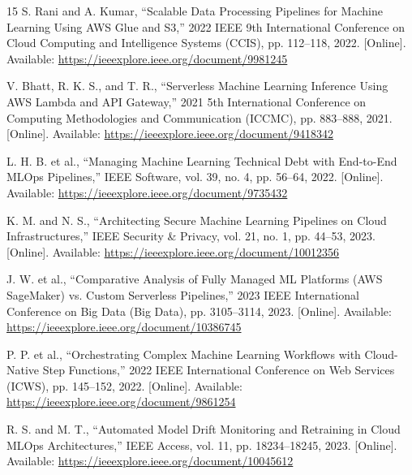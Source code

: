 \documentclass[conference]{IEEEtran}
\begin{document}
\begin{thebibliography}{15}
S. Rani and A. Kumar, ``Scalable Data Processing Pipelines for Machine Learning Using AWS Glue and S3,'' 2022 IEEE 9th International Conference on Cloud Computing and Intelligence Systems (CCIS), pp. 112--118, 2022. [Online]. Available: \url{https://ieeexplore.ieee.org/document/9981245}

V. Bhatt, R. K. S., and T. R., ``Serverless Machine Learning Inference Using AWS Lambda and API Gateway,'' 2021 5th International Conference on Computing Methodologies and Communication (ICCMC), pp. 883--888, 2021. [Online]. Available: \url{https://ieeexplore.ieee.org/document/9418342}

L. H. B. et al., ``Managing Machine Learning Technical Debt with End-to-End MLOps Pipelines,'' IEEE Software, vol. 39, no. 4, pp. 56--64, 2022. [Online]. Available: \url{https://ieeexplore.ieee.org/document/9735432}

K. M. and N. S., ``Architecting Secure Machine Learning Pipelines on Cloud Infrastructures,'' IEEE Security \& Privacy, vol. 21, no. 1, pp. 44--53, 2023. [Online]. Available: \url{https://ieeexplore.ieee.org/document/10012356}

J. W. et al., ``Comparative Analysis of Fully Managed ML Platforms (AWS SageMaker) vs. Custom Serverless Pipelines,'' 2023 IEEE International Conference on Big Data (Big Data), pp. 3105--3114, 2023. [Online]. Available: \url{https://ieeexplore.ieee.org/document/10386745}

P. P. et al., ``Orchestrating Complex Machine Learning Workflows with Cloud-Native Step Functions,'' 2022 IEEE International Conference on Web Services (ICWS), pp. 145--152, 2022. [Online]. Available: \url{https://ieeexplore.ieee.org/document/9861254}

R. S. and M. T., ``Automated Model Drift Monitoring and Retraining in Cloud MLOps Architectures,'' IEEE Access, vol. 11, pp. 18234--18245, 2023. [Online]. Available: \url{https://ieeexplore.ieee.org/document/10045612}

\end{thebibliography}
\end{document}
